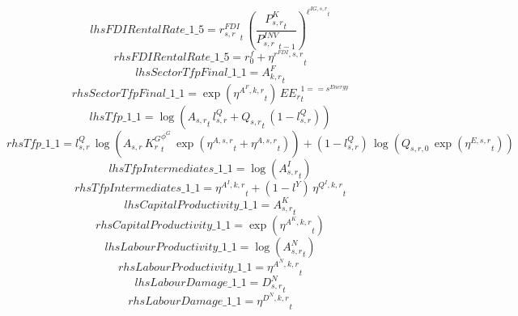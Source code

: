 \begin{dmath*}
lhsFDIRentalRate\_1\_5 = {{r^{FDI}_{s,r}}}_{t}\, \left(\frac{{{P^K_{s,r}}}_{t}}{{{P^{INV}_{s,r}}}_{t-1}}\right)^{{{\ell^{IG,s,r}}}_{t}}
\end{dmath*}
\begin{dmath*}
rhsFDIRentalRate\_1\_5 = {{r^f_0}}+{{\eta^{r^{FDI},s,r}}}_{t}
\end{dmath*}
\begin{dmath*}
lhsSectorTfpFinal\_1\_1 = {{A^{F}_{k,r}}}_{t}
\end{dmath*}
\begin{dmath*}
rhsSectorTfpFinal\_1\_1 = \exp\left({{\eta^{A^F,k,r}}}_{t}\right)\, {{EE_r}}_{t}^{1=={{s^{Energy}}}}
\end{dmath*}
\begin{dmath*}
lhsTfp\_1\_1 = \log\left({{A_{s,r}}}_{t}\, {{l^{Q}_{s,r}}}+{{Q_{s,r}}}_{t}\, \left(1-{{l^{Q}_{s,r}}}\right)\right)
\end{dmath*}
\begin{dmath*}
rhsTfp\_1\_1 = {{l^{Q}_{s,r}}}\, \log\left({{A_{s,r}}}\, {{K^G_{r}}}_{t}^{{{\phi^{G}}}}\, \exp\left({{\eta^{A,s,r}}}_{t}+{{\eta^{A,s,r}}}_{t}\right)\right)+\left(1-{{l^{Q}_{s,r}}}\right)\, \log\left({{Q_{s,r,0}}}\, \exp\left({{\eta^{E,s,r}}}_{t}\right)\right)
\end{dmath*}
\begin{dmath*}
lhsTfpIntermediates\_1\_1 = \log\left({{A^{I}_{s,r}}}_{t}\right)
\end{dmath*}
\begin{dmath*}
rhsTfpIntermediates\_1\_1 = {{\eta^{A^{I},k,r}}}_{t}+\left(1-{{l^{Y}}}\right)\, {{\eta^{Q^{I},k,r}}}_{t}
\end{dmath*}
\begin{dmath*}
lhsCapitalProductivity\_1\_1 = {{A^{K}_{s,r}}}_{t}
\end{dmath*}
\begin{dmath*}
rhsCapitalProductivity\_1\_1 = \exp\left({{\eta^{A^{K},k,r}}}_{t}\right)
\end{dmath*}
\begin{dmath*}
lhsLabourProductivity\_1\_1 = \log\left({{A^{N}_{s,r}}}_{t}\right)
\end{dmath*}
\begin{dmath*}
rhsLabourProductivity\_1\_1 = {{\eta^{A^{N},k,r}}}_{t}
\end{dmath*}
\begin{dmath*}
lhsLabourDamage\_1\_1 = {{D^N_{s,r}}}_{t}
\end{dmath*}
\begin{dmath*}
rhsLabourDamage\_1\_1 = {{\eta^{D^{N},k,r}}}_{t}
\end{dmath*}
